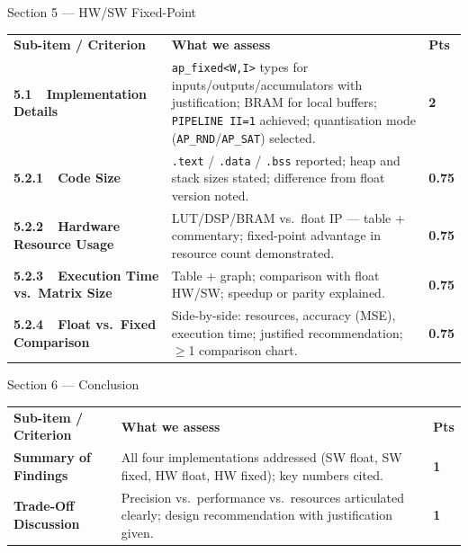 \documentclass[10pt,aspectratio=169]{beamer}
\begin{document}
\begin{frame}{Section 5 --- HW/SW Fixed-Point}
\setlength{\extrarowheight}{2pt}\setlength{\tabcolsep}{4pt}
\begin{tabular}{m{3.8cm}m{8.8cm}>{\raggedleft\arraybackslash}m{1.4cm}}
\rowcolor{C5}
\textbf{\color{white}Sub-item / Criterion} &
\textbf{\color{white}What we assess} &
\textbf{\color{white}Pts} \tabularnewline
\textbf{5.1\ \ Implementation Details} &
  {\color{TxtMd}\texttt{ap\_fixed<W,I>} types for inputs/outputs/accumulators with justification; BRAM for local buffers; \texttt{PIPELINE II=1} achieved; quantisation mode (\texttt{AP\_RND}/\texttt{AP\_SAT}) selected.} &
  \textbf{\color{C5}2} \tabularnewline
\textbf{5.2.1\ \ Code Size} &
  {\color{TxtMd}\texttt{.text} / \texttt{.data} / \texttt{.bss} reported; heap and stack sizes stated; difference from float version noted.} &
  \textbf{\color{C5}0.75} \tabularnewline
\textbf{5.2.2\ \ Hardware Resource Usage} &
  {\color{TxtMd}LUT/DSP/BRAM vs.\ float IP --- table + commentary; fixed-point advantage in resource count demonstrated.} &
  \textbf{\color{C5}0.75} \tabularnewline
\textbf{5.2.3\ \ Execution Time vs.\ Matrix Size} &
  {\color{TxtMd}Table + graph; comparison with float HW/SW; speedup or parity explained.} &
  \textbf{\color{C5}0.75} \tabularnewline
\textbf{5.2.4\ \ Float vs.\ Fixed Comparison} &
  {\color{TxtMd}Side-by-side: resources, accuracy (MSE), execution time; justified recommendation; $\geq$1 comparison chart.} &
  \textbf{\color{C5}0.75} \tabularnewline
\end{tabular}
\end{frame}

\begin{frame}{Section 6 --- Conclusion}
\setlength{\extrarowheight}{2pt}\setlength{\tabcolsep}{4pt}
\begin{tabular}{m{3.8cm}m{8.8cm}>{\raggedleft\arraybackslash}m{1.4cm}}
\rowcolor{C6}
\textbf{\color{white}Sub-item / Criterion} &
\textbf{\color{white}What we assess} &
\textbf{\color{white}Pts} \tabularnewline
\textbf{Summary of Findings} &
  {\color{TxtMd}All four implementations addressed (SW float, SW fixed, HW float, HW fixed); key numbers cited.} &
  \textbf{\color{C6}1} \tabularnewline
\textbf{Trade-Off Discussion} &
  {\color{TxtMd}Precision vs.\ performance vs.\ resources articulated clearly; design recommendation with justification given.} &
  \textbf{\color{C6}1} \tabularnewline
\end{tabular}
\end{frame}
\end{document}
